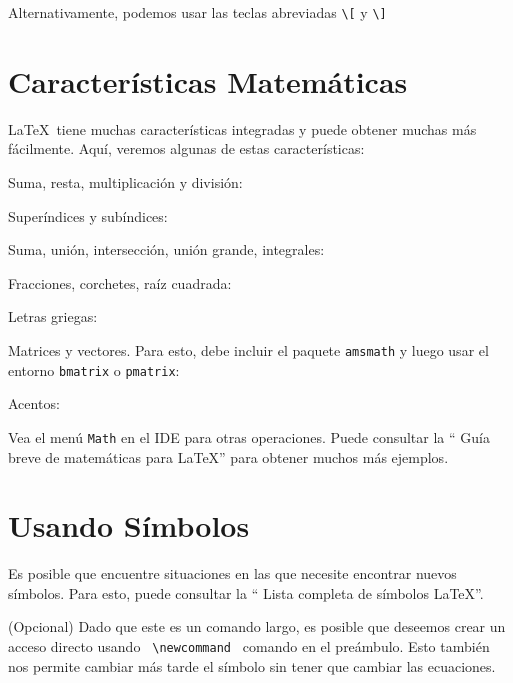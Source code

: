 \documentclass{article}
\begin{document}
Alternativamente, podemos usar las teclas abreviadas \verb|\[| y \verb|\]|



\section{Características Matemáticas}
\LaTeX\ tiene muchas características integradas y puede obtener muchas más fácilmente. Aquí, veremos algunas de estas características:

Suma, resta, multiplicación y división:


Superíndices y subíndices:



Suma, unión, intersección, unión grande, integrales:



Fracciones, corchetes, raíz cuadrada:


Letras griegas:



Matrices y vectores. Para esto, debe incluir el paquete \texttt {amsmath} y luego usar el entorno \texttt {bmatrix} o \texttt {pmatrix}:


Acentos:



Vea el menú \texttt {Math} en el IDE para otras operaciones. Puede consultar la `` Guía breve de matemáticas para \LaTeX '' para obtener muchos más ejemplos. 

\section{Usando Símbolos} 
Es posible que encuentre situaciones en las que necesite encontrar nuevos símbolos. Para esto, puede consultar la `` Lista completa de símbolos \LaTeX ''.






(Opcional) Dado que este es un comando largo, es posible que deseemos crear un acceso directo usando \verb| \newcommand | comando en el preámbulo. Esto también nos permite cambiar más tarde el símbolo sin tener que cambiar las ecuaciones.
\end{document}
